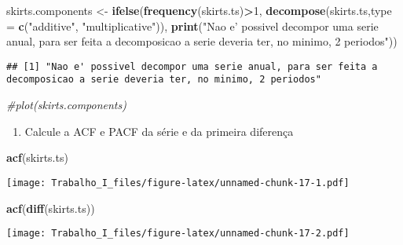 \documentclass[]{article}
\newenvironment{Shaded}{\begin{snugshade}}{\end{snugshade}}
\newcommand{\KeywordTok}[1]{\textcolor[rgb]{0.13,0.29,0.53}{\textbf{#1}}}
\newcommand{\DataTypeTok}[1]{\textcolor[rgb]{0.13,0.29,0.53}{#1}}
\newcommand{\DecValTok}[1]{\textcolor[rgb]{0.00,0.00,0.81}{#1}}
\newcommand{\StringTok}[1]{\textcolor[rgb]{0.31,0.60,0.02}{#1}}
\newcommand{\CommentTok}[1]{\textcolor[rgb]{0.56,0.35,0.01}{\textit{#1}}}
\newcommand{\OperatorTok}[1]{\textcolor[rgb]{0.81,0.36,0.00}{\textbf{#1}}}
\newcommand{\NormalTok}[1]{#1}
\providecommand{\tightlist}{%
  \setlength{\itemsep}{0pt}\setlength{\parskip}{0pt}}
\begin{document}
\begin{Shaded}
\begin{Highlighting}[]
\NormalTok{skirts.components <-}\StringTok{ }\KeywordTok{ifelse}\NormalTok{(}\KeywordTok{frequency}\NormalTok{(skirts.ts)}\OperatorTok{>}\DecValTok{1}\NormalTok{,}
                        \KeywordTok{decompose}\NormalTok{(skirts.ts,}\DataTypeTok{type =} \KeywordTok{c}\NormalTok{(}\StringTok{"additive"}\NormalTok{, }\StringTok{"multiplicative"}\NormalTok{)),}
                        \KeywordTok{print}\NormalTok{(}\StringTok{"Nao e' possivel decompor uma serie anual, para ser feita a decomposicao a serie deveria ter, no minimo, 2 periodos"}\NormalTok{))}
\end{Highlighting}
\end{Shaded}

\begin{verbatim}
## [1] "Nao e' possivel decompor uma serie anual, para ser feita a decomposicao a serie deveria ter, no minimo, 2 periodos"
\end{verbatim}

\begin{Shaded}
\begin{Highlighting}[]
\CommentTok{#plot(skirts.components)}
\end{Highlighting}
\end{Shaded}

\begin{enumerate}
\def\labelenumi{\alph{enumi})}
\setcounter{enumi}{2}
\tightlist
\item
  Calcule a ACF e PACF da série e da primeira diferença
\end{enumerate}

\begin{Shaded}
\begin{Highlighting}[]
\KeywordTok{acf}\NormalTok{(skirts.ts)}
\end{Highlighting}
\end{Shaded}

\texttt{[image: Trabalho\_I\_files/figure-latex/unnamed-chunk-17-1.pdf]}

\begin{Shaded}
\begin{Highlighting}[]
\KeywordTok{acf}\NormalTok{(}\KeywordTok{diff}\NormalTok{(skirts.ts))}
\end{Highlighting}
\end{Shaded}

\texttt{[image: Trabalho\_I\_files/figure-latex/unnamed-chunk-17-2.pdf]}
\end{document}
